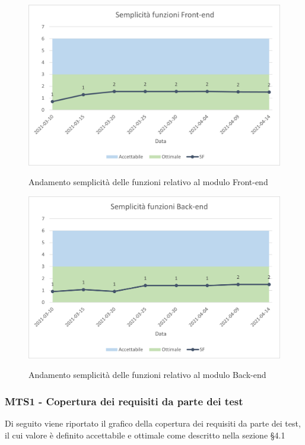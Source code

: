 \begin{figure}[H]
\centering
\includegraphics[scale=0.78]{res/ResocontoAttivitaDiVerifica/res/metriche/grafici/img/SFFE.png}\\
\caption{Andamento semplicità delle funzioni relativo al modulo Front-end}
\end{figure}

\begin{figure}[H]
\centering
\includegraphics[scale=0.78]{res/ResocontoAttivitaDiVerifica/res/metriche/grafici/img/SFBE.png}\\
\caption{Andamento semplicità delle funzioni relativo al modulo Back-end}
\end{figure}


\subsubsection{MTS1 - Copertura dei requisiti da parte dei test}
Di seguito viene riportato il grafico della copertura dei requisiti da parte dei test, il cui valore è definito accettabile e ottimale come descritto nella sezione §4.1\\


